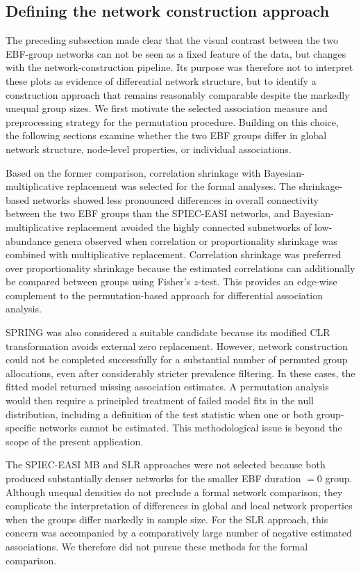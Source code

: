 \subsection{Defining the network construction approach}
\label{sec:7app:network:comparison:approach}

The preceding subsection made clear that the visual contrast between the two EBF-group networks can not be seen as a fixed feature of the data, but changes with the network-construction pipeline. Its purpose was therefore not to interpret these plots as evidence of differential network structure, but to identify a construction approach that remains reasonably comparable despite the markedly unequal group sizes. We first motivate the selected association measure and preprocessing strategy for the permutation procedure. Building on this choice, the following sections examine whether the two EBF groups differ in global network structure, node-level properties, or individual associations.

Based on the former comparison, correlation shrinkage with Bayesian-multiplicative replacement was selected for the formal analyses. The shrinkage-based networks showed less pronounced differences in overall connectivity between the two EBF groups than the SPIEC-EASI networks, and Bayesian-multiplicative replacement avoided the highly connected subnetworks of low-abundance genera observed when correlation or proportionality shrinkage was combined with multiplicative replacement. Correlation shrinkage was preferred over proportionality shrinkage because the estimated correlations can additionally be compared between groups using Fisher's $z$-test. This provides an edge-wise complement to the permutation-based approach for differential association analysis.

SPRING was also considered a suitable candidate because its modified CLR transformation avoids external zero replacement. However, network construction could not be completed successfully for a substantial number of permuted group allocations, even after considerably stricter prevalence filtering. In these cases, the fitted model returned missing association estimates. A permutation analysis would then require a principled treatment of failed model fits in the null distribution, including a definition of the test statistic when one or both group-specific networks cannot be estimated. This methodological issue is beyond the scope of the present application.

The SPIEC-EASI MB and SLR approaches were not selected because both produced substantially denser networks for the smaller EBF duration $=0$ group. Although unequal densities do not preclude a formal network comparison, they complicate the interpretation of differences in global and local network properties when the groups differ markedly in sample size. For the SLR approach, this concern was accompanied by a comparatively large number of negative estimated associations. We therefore did not pursue these methods for the formal comparison.


